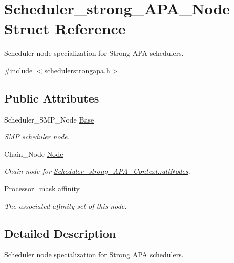 \hypertarget{structScheduler__strong__APA__Node}{}\section{Scheduler\+\_\+strong\+\_\+\+A\+P\+A\+\_\+\+Node Struct Reference}
\label{structScheduler__strong__APA__Node}


Scheduler node specialization for Strong A\+PA schedulers.  




{\ttfamily \#include $<$schedulerstrongapa.\+h$>$}

\subsection*{Public Attributes}
\begin{DoxyCompactItemize}
\item 
Scheduler\+\_\+\+S\+M\+P\+\_\+\+Node \hyperlink{structScheduler__strong__APA__Node_ae86cbf5fd8743267abe33bed6d8b0fe6}{Base}
\begin{DoxyCompactList}\small\item\em S\+MP scheduler node. \end{DoxyCompactList}\item 
Chain\+\_\+\+Node \hyperlink{structScheduler__strong__APA__Node_aed93ad80a3757ffbbe0a0d1b5426b3cc}{Node}
\begin{DoxyCompactList}\small\item\em Chain node for \hyperlink{structScheduler__strong__APA__Context_ad850b98c29b7ab48bb7aff1a941fb331}{Scheduler\+\_\+strong\+\_\+\+A\+P\+A\+\_\+\+Context\+::all\+Nodes}. \end{DoxyCompactList}\item 
Processor\+\_\+mask \hyperlink{structScheduler__strong__APA__Node_a2e8928b11f1738a11c228780eb849989}{affinity}
\begin{DoxyCompactList}\small\item\em The associated affinity set of this node. \end{DoxyCompactList}\end{DoxyCompactItemize}


\subsection{Detailed Description}
Scheduler node specialization for Strong A\+PA schedulers. 

